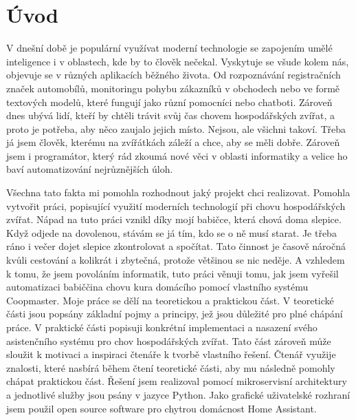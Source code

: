 \setlength{\parindent}{0pt}

\chapter{Úvod}\label{ch:uvod}

V dnešní době je populární využívat moderní technologie se zapojením umělé inteligence i v oblastech, kde by to člověk nečekal.
Vyskytuje se všude kolem nás, objevuje se v různých aplikacích běžného života.
Od rozpoznávání registračních značek automobílů, monitoringu pohybu zákazníků v obchodech nebo ve formě textových modelů, které fungují jako různí pomocníci nebo chatboti.
Zároveň dnes ubývá lidí, kteří by chtěli trávit svůj čas chovem hospodářských zvířat, a proto je potřeba, aby něco zaujalo jejich místo.
Nejsou, ale všichni takoví.
Třeba já jsem člověk, kterému na zvířátkách záleží a chce, aby se měli dobře.
Zároveň jsem i programátor, který rád zkoumá nové věci v oblasti informatiky a velice ho baví automatizování nejrůznějších úloh. \par
Všechna tato fakta mi pomohla rozhodnout jaký projekt chci realizovat.
Pomohla vytvořit práci, popisující využití moderních technologií při chovu hospodářských zvířat.
Nápad na tuto práci vznikl díky mojí babičce, která chová doma slepice.
Když odjede na dovolenou, stávám se já tím, kdo se o ně musí starat.
Je třeba ráno i večer dojet slepice zkontrolovat a spočítat.
Tato činnost je časově náročná kvůli cestování a kolikrát i zbytečná, protože většinou se nic neděje.
A vzhledem k tomu, že jsem povoláním informatik, tuto práci věnuji tomu, jak jsem vyřešil automatizaci babiččina chovu kura domácího pomocí vlastního systému Coopmaster.\newline
Moje práce se dělí na teoretickou a praktickou část.
V teoretické části jsou popsány základní pojmy a principy, jež jsou důležité pro plné chápání práce.
V praktické části popisuji konkrétní implementaci a nasazení svého asistenčního systému pro chov hospodářských zvířat.
Tato část zároveň může sloužit k motivaci a inspiraci čtenáře k tvorbě vlastního řešení.
Čtenář využije znalosti, které nasbírá během čtení teoretické části, aby mu následně pomohly chápat praktickou část.\newline
Řešení jsem realizoval pomocí mikroservisní architektury a jednotlivé služby jsou psány v jazyce Python.
Jako grafické uživatelské rozhraní jsem použil open source software pro chytrou domácnost Home Assistant.

